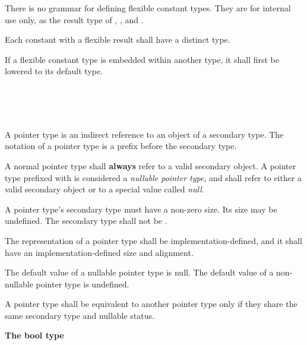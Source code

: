 \specsubsubitem
There is no grammar for defining flexible constant types. They are for internal
use only, as the result type of ,
, and .

\specsubsubitem
Each constant with a flexible result shall have a distinct type.

\specsubsubitem
If a flexible constant type is embedded within another type, it shall first be
lowered to its default type.



\begin{grammar}
 \\
	\terminal{*}  \\
	 \terminal{*}  \\
\end{grammar}

\specsubsubitem
A pointer type is an indirect reference to an object of a secondary type. The
notation of a pointer type is a \terminal{*} prefix before the secondary type.

\specsubsubitem
A normal pointer type shall \textbf{always} refer to a valid secondary object.
A pointer type prefixed with  is considered a
\textit{nullable pointer type}, and shall refer to either a valid secondary object
or to a special value called \textit{null}.

\specsubsubitem
A pointer type's secondary type must have a non-zero size. Its size may be
undefined. The secondary type shall not be .

\specsubsubitem
The representation of a pointer type shall be implementation-defined, and it
shall have an implementation-defined size and alignment.

\specsubsubitem
The default value of a nullable pointer type is null. The default value of a
non-nullable pointer type is undefined.

\specsubsubitem
A pointer type shall be equivalent to another pointer type only if they share
the same secondary type and nullable status.


\textbf{The bool type}

